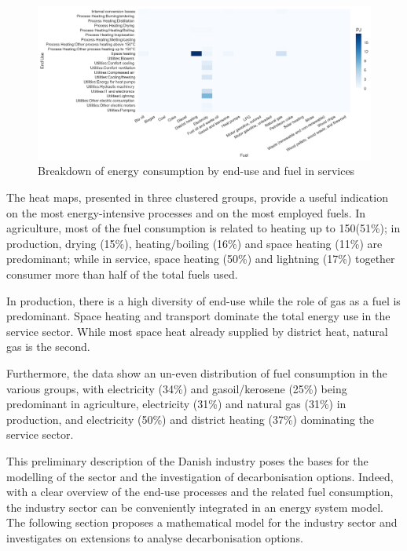 \documentclass[review]{elsarticle}
\begin{document}
\begin{figure}[H]
\centering
\includegraphics[width=\linewidth]{Img/dan_ind/heatmap_serv.png}
\caption{Breakdown of energy consumption by end-use and fuel in services\cite{VM2015}}
\label{heatmapserv} 
\end{figure}
\fi

The heat maps, presented in three clustered groups, provide a useful indication on the most energy-intensive processes and on the most employed fuels. 
In agriculture, most of the fuel consumption is related to heating up to 150\textdegree (51\%); in production, drying (15\%), heating/boiling (16\%) and space heating (11\%) are predominant; while in service, space heating (50\%) and lightning (17\%) together consumer more than half of the total fuels used.

In production, there is a high diversity of end-use while the role of gas as a fuel is predominant. 
Space heating and transport dominate the total energy use in the service sector. While most space heat already supplied by district heat, natural gas is the second.

Furthermore, the data show an un-even distribution of fuel consumption in the various groups, with electricity (34\%) and gasoil/kerosene (25\%) being predominant in agriculture, electricity (31\%) and natural gas (31\%) in production, and electricity (50\%) and district heating (37\%) dominating the service sector.

This preliminary description of the Danish industry poses the bases for the modelling of the sector and the investigation of decarbonisation options. Indeed, with a clear overview of the end-use processes and the related fuel consumption, the industry sector can be conveniently integrated in an energy system model. 
The following section proposes a mathematical model for the industry sector and investigates on extensions to analyse decarbonisation options. 
\end{document}
